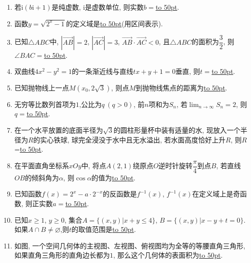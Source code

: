 \documentclass[10pt,a4paper]{article}
\newcommand{\blank}[1]{\underline{\hbox to #1pt{}}}
\begin{document}
\begin{enumerate}[1.]
\item 若$\mathrm{i}(b\mathrm{i}+1)$是纯虚数, $\mathrm{i}$是虚数单位, 则实数$b=$\blank{50}.
\item 函数$y=\sqrt{2^x-1}$的定义域是\blank{50}(用区间表示).
\item 已知$\triangle ABC$中, $|\overrightarrow{AB}|=2 $,  $|\overrightarrow{AC}|=3 $, $\overrightarrow{AB}\cdot \overrightarrow{AC}<0$, 且$\triangle ABC$的面积为$\dfrac32$, 则$\angle BAC=$\blank{50}.
\item 双曲线$4 x^2-y^2=1$的一条渐近线与直线$tx+y+1=0$垂直, 则$t=$\blank{50}.
\item 已知抛物线上一点$M(x_0,2 \sqrt3)$, 则点$M$到抛物线焦点的距离为\blank{50}.
\item 无穷等比数列首项为$1$,公比为$q \ (q>0)$, 前$n$项和为$S_n$, 若$\displaystyle\lim_{n\to\infty}S_n=2$, 则$q=$\blank{50}.
\item 在一个水平放置的底面半径为$\sqrt 3$的圆柱形量杯中装有适量的水, 现放入一个半径为$R$的实心铁球, 球完全浸没于水中且无水溢出, 若水面高度恰好上升$R$, 则$R$=\blank{50}.
\item 在平面直角坐标系$xOy$中, 将点$A(2,1)$绕原点$O$逆时针旋转$\dfrac\pi 4$到点$B$, 若直线$OB$的倾斜角为$\alpha$, 则$\cos \alpha$的值为\blank{50}.
\item 已知函数$f(x)=2^x-a\cdot 2^{-x}$的反函数是$f^{-1}(x)$, $f^{-1}(x)$在定义域上是奇函数, 则正实数$a=$\blank{50}.
\item 已知$x\ge 1$, $y\ge 0$, 集合$A=\{(x,y)|x+y\le 4\}$, $B=\{(x,y)|x-y+t=0\}$. 如果$A\cap B\ne \varnothing$,则$t$的取值范围是\blank{50}.
\item 如图, 一个空间几何体的主视图、左视图、俯视图均为全等的等腰直角三角形, 如果直角三角形的直角边长都为$1$, 那么这个几何体的表面积为\blank{50}.
\begin{center}
\end{center}



\end{enumerate}
\end{document}

